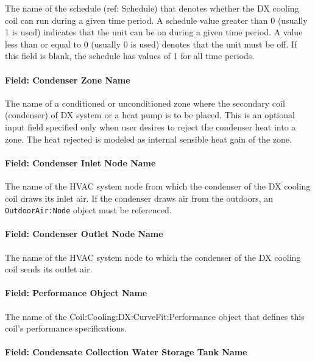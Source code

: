 The name of the schedule (ref: Schedule) that denotes whether the DX cooling coil can run during a given time period. A schedule value greater than 0 (usually 1 is used) indicates that the unit can be on during a given time period. A value less than or equal to 0 (usually 0 is used) denotes that the unit must be off. If this field is blank, the schedule has values of 1 for all time periods.

\paragraph{Field: Condenser Zone Name}\label{field-condenser-zone-name-6-001}

The name of a conditioned or unconditioned zone where the secondary coil (condenser) of DX system or a heat pump is to be placed. This is an optional input field specified only when user desires to reject the condenser heat into a zone. The heat rejected is modeled as internal sensible heat gain of the zone.

\paragraph{Field: Condenser Inlet Node Name}\label{field-condenser-inlet-node-name-6-001}

The name of the HVAC system node from which the condenser of the DX cooling coil draws its inlet air. If the condenser draws air from the outdoors, an \texttt{OutdoorAir:Node} object must be referenced.

\paragraph{Field: Condenser Outlet Node Name}\label{field-condenser-outlet-node-name-6-001}

The name of the HVAC system node to which the condenser of the DX cooling coil sends its outlet air.

\paragraph{Field: Performance Object Name}\label{field-performance-object-name-6-001}

The name of the Coil:Cooling:DX:CurveFit:Performance object that defines this coil's performance specifications.

\paragraph{Field: Condensate Collection Water Storage Tank Name}

